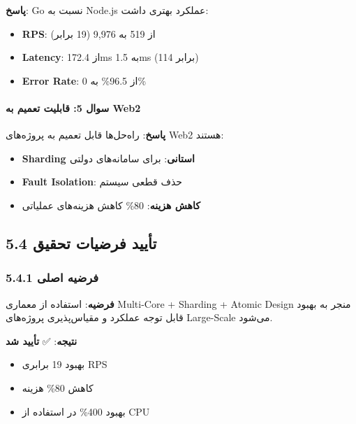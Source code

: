 \documentclass[
]{article}
\providecommand{\tightlist}{%
  \setlength{\itemsep}{0pt}\setlength{\parskip}{0pt}}
\begin{document}
\textbf{پاسخ}: Go نسبت به Node.js عملکرد بهتری داشت:

\begin{itemize}
\tightlist
\item
  \textbf{RPS}: از 519 به 9,976 (19 برابر)
\item
  \textbf{Latency}: از 172.4ms به 1.5ms (114 برابر)
\item
  \textbf{Error Rate}: از 96.5\% به 0\%
\end{itemize}

\paragraph{سوال 5: قابلیت تعمیم به
Web2}\label{ux633ux648ux627ux644-5-ux642ux627ux628ux644ux6ccux62a-ux62aux639ux645ux6ccux645-ux628ux647-web2}

\textbf{پاسخ}: راه‌حل‌ها قابل تعمیم به پروژه‌های Web2 هستند:

\begin{itemize}
\tightlist
\item
  \textbf{Sharding استانی}: برای سامانه‌های دولتی
\item
  \textbf{Fault Isolation}: حذف قطعی سیستم
\item
  \textbf{کاهش هزینه}: 80\% کاهش هزینه‌های عملیاتی
\end{itemize}

\subsection{5.4 تأیید فرضیات
تحقیق}\label{ux62aux623ux6ccux6ccux62f-ux641ux631ux636ux6ccux627ux62a-ux62aux62dux642ux6ccux642}

\subsubsection{5.4.1 فرضیه
اصلی}\label{ux641ux631ux636ux6ccux647-ux627ux635ux644ux6cc}

\textbf{فرضیه}: استفاده از معماری Multi-Core + Sharding + Atomic Design
منجر به بهبود قابل توجه عملکرد و مقیاس‌پذیری پروژه‌های Large-Scale می‌شود.

\textbf{نتیجه}: ✅ \textbf{تأیید شد}

\begin{itemize}
\tightlist
\item
  بهبود 19 برابری RPS
\item
  کاهش 80\% هزینه
\item
  بهبود 400\% در استفاده از CPU
\end{itemize}
\end{document}

